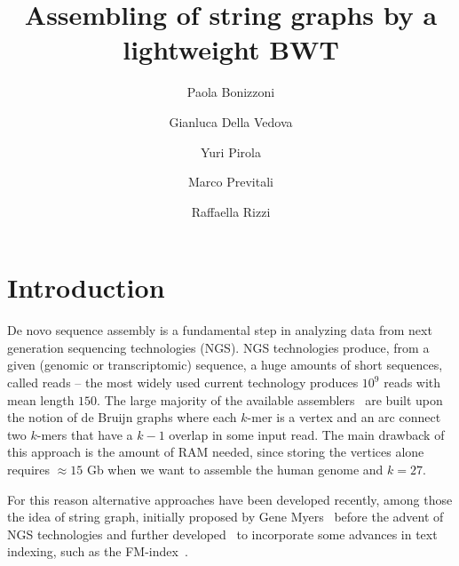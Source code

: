 \documentclass[runningheads,envcountsame,a4paper]{llncs}
\newcommand{\etal}{\textit{et al.}\xspace}
\begin{document}
\title{Assembling of  string graphs by a lightweight BWT}

\author{%
  Paola Bonizzoni \and
  Gianluca Della Vedova \and
  Yuri Pirola \and
  Marco Previtali \and
  Raffaella Rizzi
}
\authorrunning{Bonizzoni \etal}


\maketitle

\begin{abstract}


\end{abstract}

\section{Introduction}
De novo sequence assembly is a fundamental step
in analyzing data from next generation sequencing technologies (NGS).
NGS technologies produce, from a given (genomic or transcriptomic) sequence, a huge amounts
of short sequences, called reads -- the most widely used current technology
produces $10^{9}$ reads with mean length $150$.
The large majority of the available
assemblers~\cite{Zerbino2008,Simpson2009,Peng2010,bankevich2012spades} are built
upon the notion of de Bruijn graphs where each $k$-mer is a vertex and an arc
connect two $k$-mers that have a $k-1$ overlap in some input read.
The main drawback of this approach is the amount of RAM needed, since storing
the vertices alone requires $\approx 15$ Gb when we want to assemble the human genome
and $k=27$.

For this reason alternative approaches have been developed recently, among those
the idea of string graph, initially proposed by Gene Myers~\cite{Myers2005}
before the advent of NGS technologies and further
developed~\cite{Simpson2010,Simpson2012} to incorporate some advances in text
indexing, such as the FM-index~\cite{Ferragina2000}.
\end{document}
